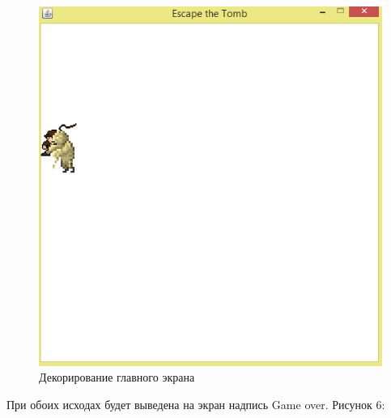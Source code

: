 \documentclass[a4paper]{article}
\begin{document}
\begin{figure}[H]
	\begin{center}
		\includegraphics[scale=0.7]{image/field4.png}
		\caption{Декорирование главного экрана} 
		\label{pic:pic_name} %
	\end{center}
\end{figure}

При обоих исходах будет выведена на экран надпись Game over. Рисунок 6:
\end{document}
